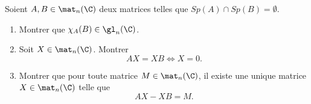 \begin{enonce}
\begin{exercise}[ID={RMS127 E690},subtitle={Mines-Ponts PSI 2016},tags={}]
  Soient $A,B\in\mat_n(\C)$ deux matrices telles que $Sp(A)\cap Sp(B)=\emptyset$.
  \begin{enumerate}
    \item Montrer que $\chi_A(B) \in\gl_n(\C)$.
    \item Soit $X\in\mat_n(\C)$.  Montrer 
      \begin{equation*}
        AX=XB \iff X=0.
      \end{equation*}
    \item Montrer que pour toute matrice $M\in\mat_n(\C)$, il existe une unique matrice $X\in\mat_n(\C)$ telle que 
      \begin{equation*} AX - XB = M.\end{equation*}
  \end{enumerate}
\end{exercise}
\begin{solution}
\end{solution}
\end{enonce}
